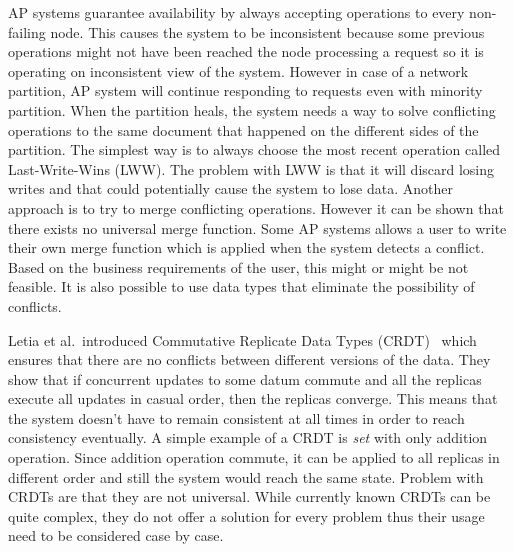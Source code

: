 AP systems guarantee availability by always accepting operations to every
non-failing node. This causes the system to be inconsistent because some
previous operations might not have been reached the node processing a request so
it is operating on inconsistent view of the system. However in case of a network
partition, AP system will continue responding to requests even with minority
partition. When the partition heals, the system needs a way to solve conflicting
operations to the same document that happened on the different sides of the
partition. The simplest way is
to always choose the most recent operation called Last-Write-Wins (LWW). The
problem with LWW is that it will discard losing writes and that could
potentially cause the system to lose data. Another approach is to try to merge
conflicting operations. However it can be shown that there exists no universal
merge function. Some AP systems allows a user to write
their own merge function which is applied when the system detects a conflict.
Based on the business requirements of the user, this might or might be not
feasible. It is also possible to use data types that eliminate the possibility
of conflicts.

Letia et al.\ introduced Commutative Replicate Data Types
(CRDT)~\cite{letia2009crdts} which ensures that there are no conflicts between
different versions of the data. They show that if concurrent updates to some
datum commute and all the replicas execute all updates in casual order, then the
replicas converge. This means that the system doesn't have to remain consistent
at all times in order to reach consistency eventually. A simple example of a
CRDT is \emph{set} with only addition operation. Since addition operation
commute, it can be applied to all replicas in different order and still the
system would reach the same state. Problem with CRDTs are that they are not
universal. While currently known CRDTs can be quite complex, they do not offer a
solution for every problem thus their usage need to be considered case by case.

